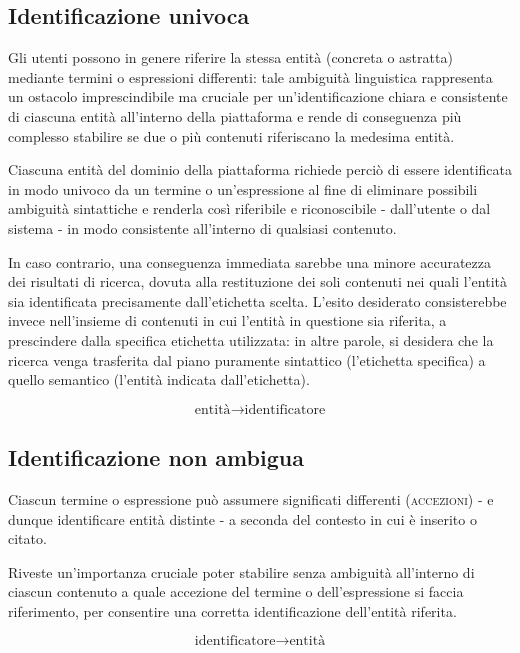 \documentclass[10pt,a4paper,headinclude,footinclude,hidelinks]{scrreprt} %
\begin{document}
	\subsection{Identificazione univoca}
	Gli utenti possono in genere riferire la stessa entità (concreta o astratta) mediante termini o espressioni differenti: tale ambiguità linguistica rappresenta un ostacolo imprescindibile ma cruciale per un'identificazione chiara e consistente di ciascuna entità all'interno della piattaforma e rende di conseguenza più complesso stabilire se due o più contenuti riferiscano la medesima entità.

	Ciascuna entità del dominio della piattaforma richiede perciò di essere identificata in modo univoco da un termine o un'espressione al fine di eliminare possibili ambiguità sintattiche e renderla così riferibile e riconoscibile - dall'utente o dal sistema - in modo consistente all'interno di qualsiasi contenuto.

	In caso contrario, una conseguenza immediata sarebbe una minore accuratezza dei risultati di ricerca, dovuta alla restituzione dei soli contenuti nei quali l'entità sia identificata precisamente dall'etichetta scelta. L'esito desiderato consisterebbe invece nell'insieme di contenuti in cui l'entità in questione sia riferita, a prescindere dalla specifica etichetta utilizzata: in altre parole, si desidera che la ricerca venga trasferita dal piano puramente sintattico (l'etichetta specifica) a quello semantico (l'entità indicata dall'etichetta).

	$$ \textrm{entità} \rightarrow \textrm{identificatore}	$$

	\subsection{Identificazione non ambigua}
	Ciascun termine o espressione può assumere significati differenti (\textsc{accezioni}) - e dunque identificare entità distinte - a seconda del contesto in cui è inserito o citato.

	Riveste un'importanza cruciale poter stabilire senza ambiguità all'interno di ciascun contenuto a quale accezione del termine o dell'espressione si faccia riferimento, per consentire una corretta identificazione dell'entità riferita.

	$$ \textrm{identificatore} \rightarrow \textrm{entità} $$
\end{document}
